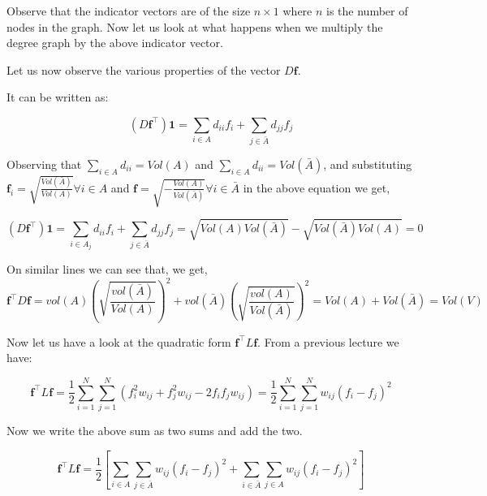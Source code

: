 \documentclass[english]{article}
\theoremstyle{plain}
\begin{document}
Observe that the indicator vectors are of the size $n \times 1$ where $n$ is the number of nodes in the graph. Now let us look at what happens when we multiply the degree graph by the above indicator vector.

Let us now observe the various properties of the vector $D\boldsymbol{f}$.

It can be written as:

\begin{equation}
\left(D\boldsymbol{f}^{\top}\right)\boldsymbol{1} =\sum_{i\in A} d_{ii}f_{i} + \sum_{j \in \bar{A}} d_{jj}f_{j}
\end{equation}

Observing that $\sum_{i\in A} d_{ii}=Vol(A)$ and $\sum_{i\in A} d_{ii}=Vol(\bar{A})$, and substituting $\boldsymbol{f}_{i} = \sqrt{\frac{Vol(\bar{A})}{Vol(A)}} \forall i \in A$ and $\boldsymbol{f} = \sqrt{-\frac{Vol(A)}{Vol(\bar{A})}} \forall i \in \bar{A}$ in the above equation we get,

\begin{equation}
\left(D\boldsymbol{f}^{\top}\right)\boldsymbol{1} =\sum_{i\in A_{j}} d_{ii}f_{i} + \sum_{j \in \bar{A}} d_{jj}f_{j} = \sqrt{Vol(A)Vol(\bar{A})}-\sqrt{Vol(\bar{A})Vol(A)} = 0
\end{equation}

On similar lines we can see that, we get,
\begin{equation}
\boldsymbol{f}^{\top}D\boldsymbol{f} = vol(A)\left(\sqrt{\frac{vol(\bar{A})}{Vol(A)}}\right)^{2} + vol(\bar{A})\left(\sqrt{\frac{vol(A)}{Vol(\bar{A})}}\right)^{2} = Vol(A) + Vol(\bar{A}) = Vol(V)
\end{equation}

Now let us have a look at the quadratic form $\boldsymbol{f}^{\top}L\boldsymbol{f}$. From a previous lecture we have:

\begin{equation}
\boldsymbol{f}^{\top}L\boldsymbol{f} = 
\frac{1}{2}\sum_{i=1}^{N} \sum_{j=1}^{N} \left( f^{2}_{i} w_{ij} + f^{2}_{j} w_{ij} - 2f_{i}f_{j} w_{ij} \right) = \frac{1}{2}\sum_{i=1}^{N} \sum_{j=1}^{N}  w_{ij}\left( f_{i} - f_{j} \right)^{2}
\end{equation}

Now we write the above sum as two sums and add the two.

\begin{equation}
\boldsymbol{f}^{\top}L\boldsymbol{f} = \frac{1}{2} \left[ \sum_{i \in A} \sum_{j \in \bar{A}}  w_{ij}\left( f_{i} - f_{j} \right)^{2} + \sum_{i \in \bar{A}} \sum_{j \in A}  w_{ij}\left( f_{i} - f_{j} \right)^{2}  \right]
\end{equation}
\end{document}
